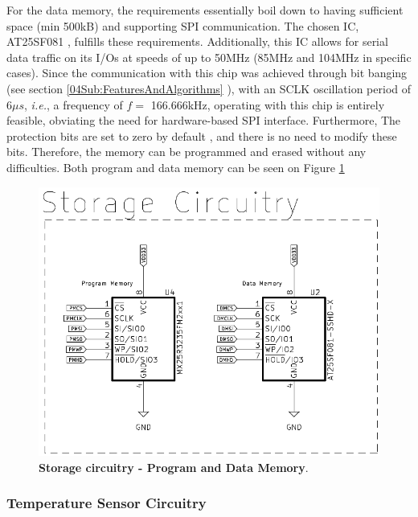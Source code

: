 For the data memory, the requirements essentially boil down to having sufficient space (min 500kB) and supporting SPI communication. The chosen IC, 
AT25SF081 \cite{DataMemoryAT}, fulfills these requirements. Additionally, this IC allows for serial data traffic on its I/Os at speeds of up to 50MHz 
(85MHz and 104MHz in specific cases). Since the communication with this chip was achieved through bit banging (see section \ref{04Sub:FeaturesAndAlgorithms}
), with an SCLK oscillation period of 6$\mu s$, \textit{i.e.}, a frequency of $f = $ 166.666kHz, operating with this chip is entirely feasible, obviating the 
need for hardware-based SPI interface. Furthermore, The protection bits are set to zero by default \cite{DataMemoryAT}, and there is no need to modify these bits. 
Therefore, the memory can be programmed and erased without any difficulties. Both program and data memory can be seen on Figure 
\ref{02fig:storageCircuitry}


\begin{figure}[H]
    \centering
    \includegraphics[scale = 0.6]{imagens/storageCircuitry.png}
    \caption{\textbf{Storage circuitry - Program and Data Memory}.}
    \label{02fig:storageCircuitry}
\end{figure}








\subsubsection{Temperature Sensor Circuitry}\label{02SubSub:TemperatureSensorCircuitry}




